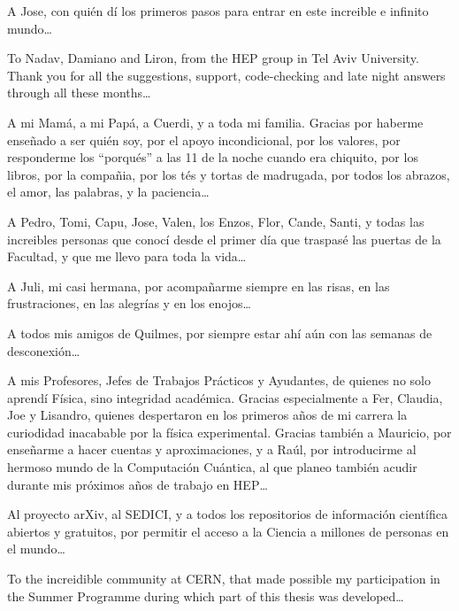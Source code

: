 {    A Jose, con quién dí los primeros pasos para entrar en este increible e infinito mundo\dots

    To Nadav, Damiano and Liron, from the HEP group in Tel Aviv University. Thank you for all the suggestions, support, code-checking and late night answers through all these months\dots

    A mi Mamá, a mi Papá, a Cuerdi, y a toda mi familia. Gracias por haberme enseñado a ser quién soy, por el apoyo incondicional, por los valores, por responderme los ``porqués'' a las 11 de la noche cuando era chiquito, por los libros, por la compañia, por los tés y tortas de madrugada, por todos los abrazos, el amor, las palabras, y la paciencia\dots

    A Pedro, Tomi, Capu, Jose, Valen, los Enzos, Flor, Cande, Santi, y todas las increibles personas que conocí desde el primer día que traspasé las puertas de la Facultad, y que me llevo para toda la vida\dots

    A Juli, mi casi hermana, por acompañarme siempre en las risas, en las frustraciones, en las alegrías y en los enojos\dots

    A todos mis amigos de Quilmes, por siempre estar ahí aún con las semanas de desconexión\dots

    A mis Profesores, Jefes de Trabajos Prácticos y Ayudantes, de quienes no solo aprendí Física, sino integridad académica. Gracias especialmente a Fer, Claudia, Joe y Lisandro, quienes despertaron en los primeros años de mi carrera la curiodidad inacabable por la física experimental. Gracias también a Mauricio, por enseñarme a hacer cuentas y aproximaciones, y a Raúl, por introducirme al hermoso mundo de la Computación Cuántica, al que planeo también acudir durante mis próximos años de trabajo en HEP\dots

    Al proyecto arXiv, al SEDICI, y a todos los repositorios de información científica abiertos y gratuitos, por permitir el acceso a la Ciencia a millones de personas en el mundo\dots

    To the increidible community at CERN, that made possible my participation in the Summer Programme during which part of this thesis was developed\dots
}

\cleardoublepage{}

